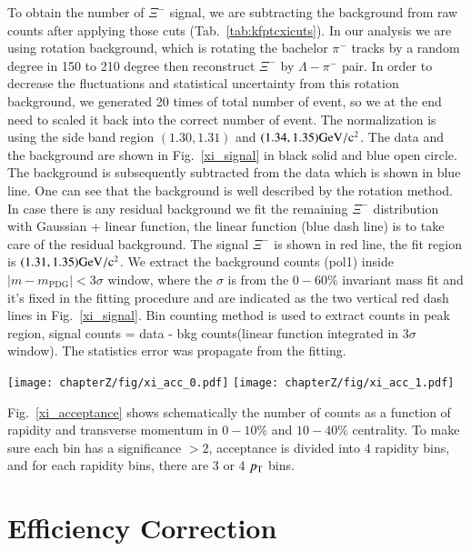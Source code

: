 To obtain the number of $\Xi^{-}$ signal, we are subtracting the background from raw counts after applying those cuts (Tab.~\ref{tab:kfptcxicuts}). In our analysis we are using rotation background, which is rotating the bachelor $\pi^{-}$ tracks by a random degree in 150 to 210 degree then reconstruct $\Xi^{-}$ by $\Lambda-\pi^{-}$ pair. In order to decrease the fluctuations and statistical uncertainty from this rotation background, we generated 20 times of total number of event, so we at the end need to scaled it back into the correct number of event. The normalization is using the side band region $(1.30, 1.31)$ and $(1.34, 1.35)\rm{GeV}/c^2$. The data and the background are shown in Fig.~\ref{xi_signal} in black solid and blue open circle. The background is subsequently subtracted from the data which is shown in blue line. One can see that the background is well described by the rotation method. In case there is any residual background we fit the remaining $\Xi^{-}$ distribution with Gaussian + linear function, the linear function (blue dash line) is to take care of the residual background. The signal $\Xi^{-}$ is shown in red line, the fit region is $(1.31, 1.35) \rm{GeV}/c^2$. We extract the background counts (pol1) inside $|m-m_{\text{PDG}}|<3\sigma$ window, where the $\sigma$ is from the $0-60\%$ invariant mass fit and it's fixed in the fitting procedure and are indicated as the two vertical red dash lines in Fig.~\ref{xi_signal}. Bin counting method is used to extract counts in peak region, signal counts = data - bkg counts(linear function integrated in $3\sigma$ window). The statistics error was propagate from the fitting.

\begin{figure*}[hbt!]
\texttt{[image: chapterZ/fig/xi\_acc\_0.pdf]}
\texttt{[image: chapterZ/fig/xi\_acc\_1.pdf]}
\caption{Acceptance of $\Xi^{-}$ for $0-10\%$(left) and $10-40\%$(right) centrality at $\sqrt{s_{NN}}$ = 3 GeV.}
\label{xi_acceptance}
\end{figure*}

Fig.~\ref{xi_acceptance} shows schematically the number of counts as a function of rapidity and transverse momentum in $0-10\%$ and $10-40\%$ centrality. To make sure each bin has a significance $>2$, acceptance is divided into 4 rapidity bins, and for each rapidity bins, there are 3 or 4 $p_{\rm T}$ bins.

\section{Efficiency Correction}

